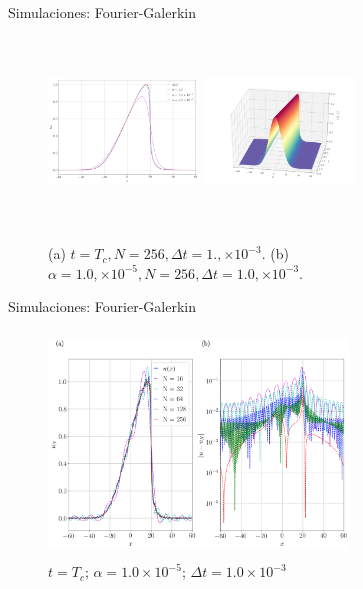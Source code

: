 \begin{frame}{Simulaciones: Fourier-Galerkin \hspace{2cm} \hyperlink{Navegador}{}}
    \begin{figure}
        \centering
        \includegraphics[height=5cm,width=4cm]{files/figures/inviscid/varios_alphas.png}
        \qquad
        \includegraphics[height=5cm,width=4cm]{files/figures/inviscid/small_alpha.png}
        \caption{(a) $t = T_c, N=256, \Delta t = 1., \times 10^{-3}.$ (b) $\alpha = 1.0, \times 10^{-5}, N=256, \Delta t = 1.0, \times 10^{-3}.$}
    \end{figure}    
\end{frame}

\begin{frame}{Simulaciones: Fourier-Galerkin \hspace{2cm} \hyperlink{Navegador}{}}
    \begin{figure}
        \centering
        \includegraphics[height=6cm,width=8cm]{files/figures/inviscid/small_alpha_T.png}
        \caption{$t = T_c$; $\alpha = 1.0 \times 10^{-5}$; $\Delta t = 1.0 \times 10^{-3}$}
    \end{figure}
\end{frame}

